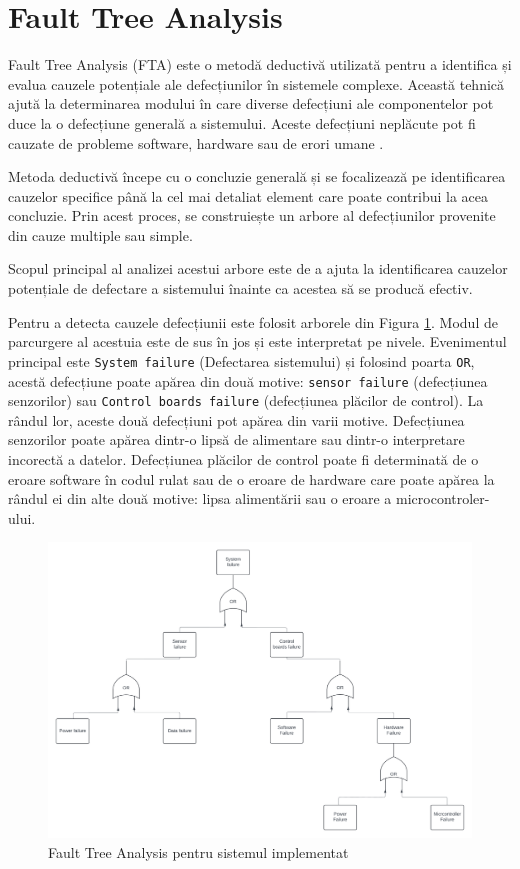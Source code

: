 \section{Fault Tree Analysis}
Fault Tree Analysis (FTA) este o metodă deductivă utilizată pentru a identifica și evalua cauzele potențiale ale defecțiunilor în sistemele complexe. Această tehnică ajută la determinarea modului în care diverse defecțiuni ale componentelor pot duce la o defecțiune generală a sistemului. Aceste defecțiuni neplăcute pot fi cauzate de probleme software, hardware sau de erori umane \cite{fiabilitate_curs}.

Metoda deductivă începe cu o concluzie generală și se focalizează pe identificarea cauzelor specifice până la cel mai detaliat element care poate contribui la acea concluzie. Prin acest proces, se construiește un arbore al defecțiunilor provenite din cauze multiple sau simple.

Scopul principal al analizei acestui arbore este de a ajuta la identificarea cauzelor potențiale de defectare a sistemului înainte ca acestea să se producă efectiv.

Pentru a detecta cauzele defecțiunii este folosit arborele din Figura \ref{fig:fta}. Modul de parcurgere al acestuia este de sus în jos și este interpretat pe nivele. Evenimentul principal este \texttt{System failure} (Defectarea sistemului) și folosind poarta \texttt{OR}, acestă defecțiune poate apărea din două motive: \texttt{sensor failure} (defecțiunea senzorilor) sau \texttt{Control boards failure} (defecțiunea plăcilor de control). La rândul lor, aceste două defecțiuni pot apărea din varii motive. Defecțiunea senzorilor poate apărea dintr-o lipsă de alimentare sau dintr-o interpretare incorectă a datelor. Defecțiunea plăcilor de control poate fi determinată de o eroare software în codul rulat sau de o eroare de hardware care poate apărea la rândul ei din alte două motive: lipsa alimentării sau o eroare a microcontroler-ului.

\begin{figure}[H]
\includegraphics[width=1\linewidth]{images/fta.png}
\caption{Fault Tree Analysis pentru sistemul implementat}
\label{fig:fta}
\end{figure}

